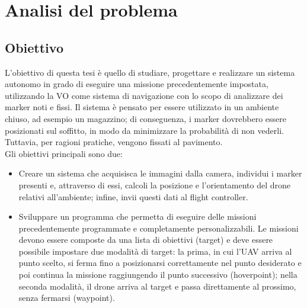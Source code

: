\chapter{Analisi del problema}
\label{chap:analisi_problema}

\section{Obiettivo}
\label{sec:problema:obiettivo}
L'obiettivo di questa tesi è quello di studiare, progettare e realizzare un sistema autonomo in grado di eseguire una missione precedentemente impostata, utilizzando la VO come sistema di navigazione con lo scopo di analizzare dei marker noti e fissi. Il sistema è pensato per essere utilizzato in un ambiente chiuso, ad esempio un magazzino; di conseguenza, i marker dovrebbero essere posizionati sul soffitto, in modo da minimizzare la probabilità di non vederli. Tuttavia, per ragioni pratiche, vengono fissati al pavimento. \\
Gli obiettivi principali sono due:
\begin{itemize}
	\item Creare un sistema che acquisisca le immagini dalla camera, individui i marker presenti e, attraverso di essi, calcoli la posizione e l'orientamento del drone relativi all'ambiente; infine, invii questi dati al flight controller.
	\item Sviluppare un programma che permetta di eseguire delle missioni precedentemente programmate e completamente personalizzabili. Le missioni devono essere composte da una lista di obiettivi (target) e deve essere possibile impostare due modalità di target: la prima, in cui l'UAV arriva al punto scelto, si ferma fino a posizionarsi correttamente nel punto desiderato e poi continua la missione raggiungendo il punto successivo (hoverpoint); nella seconda modalità, il drone arriva al target e passa direttamente al prossimo, senza fermarsi (waypoint).
\end{itemize}

